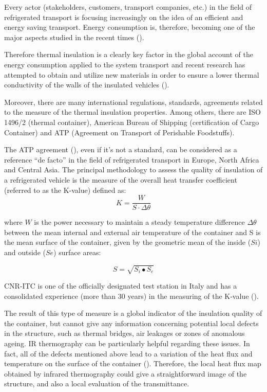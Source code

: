 Every actor (stakeholders, customers, transport companies, etc.) in the field of refrigerated transport is focusing increasingly on the idea of an efficient and energy saving transport. Energy consumption is, therefore, becoming one of the major aspects studied in the recent times (\citet{Tassou2009,Cavalier2010,Adekomaya2017}). 

Therefore thermal insulation is a clearly key factor in the global account of the energy consumption applied to the system transport and recent research has attempted to obtain and utilize new materials in order to ensure a lower thermal conductivity of the walls of the insulated vehicles (\citet{Tinti2014,Lawton2016}).

Moreover, there are many international regulations, standards, agreements related to the measure of the thermal insulation properties. Among others, there are ISO 1496/2 (thermal container), American Bureau of Shipping (certification of Cargo Container) and ATP (Agreement on Transport of Perishable Foodstuffs).

The ATP agreement (\citet{Geneva1970}), even if it’s not a standard, can be considered as a reference “de facto” in the field of refrigerated transport in Europe, North Africa and Central Asia. The principal methodology to assess the quality of insulation of a refrigerated vehicle is the measure of the overall heat transfer coefficient (referred to as the K-value) defined as:
\begin{equation}
K=\frac{W}{S⋅\Delta \theta}
\end{equation}


where $ W $ is the power necessary to maintain a steady temperature difference $ \Delta \theta $ between the mean internal and external air temperature of the container and S is the mean surface of the container, given by the geometric mean of the inside ($ Si $) and outside ($ Se $) surface areas:

\begin{equation}
S=\sqrt{S_i∙S_e}
\end{equation}

CNR-ITC is one of the officially designated test station in Italy and has a consolidated experience (more than 30 years) in the measuring of the K-value (\citet{rossi2009k}).

The result of this type of measure is a global indicator of the insulation quality of the container, but cannot give any information concerning potential local defects in the structure, such as thermal bridges, air leakages or zones of anomalous ageing. IR thermography can be particularly helpful regarding these issues. In fact, all of the defects mentioned above lead to a variation of the heat flux and temperature on the surface of the container (\citet{grinzato2010r, grinzatoquality, grinzato1comparison}). Therefore, the local heat flux map obtained by infrared thermography could give a straightforward image of the structure, and also a local evaluation of the transmittance.

